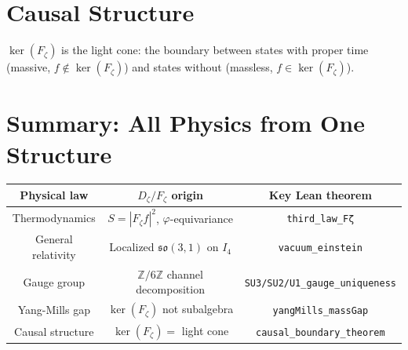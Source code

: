 \section{Causal Structure}
\label{sec:mat_causality}

\begin{theorem}
\label{thm:mat_causal_boundary}
\leanok
$\ker(F_\zeta)$ is the light cone: the boundary between states with proper time (massive, $f \notin \ker(F_\zeta)$) and states without (massless, $f \in \ker(F_\zeta)$).
\end{theorem}

\section{Summary: All Physics from One Structure}
\label{sec:mat_laws_summary}

\begin{center}
\begin{tabular}{|c|c|c|}
\hline
Physical law & $D_\zeta / F_\zeta$ origin & Key Lean theorem \\
\hline
Thermodynamics & $S = |F_\zeta f|^2$, $\varphi$-equivariance & \texttt{third\_law\_Fζ} \\
General relativity & Localized $\mathfrak{so}(3,1)$ on $I_4$ & \texttt{vacuum\_einstein} \\
Gauge group & $\mathbb{Z}/6\mathbb{Z}$ channel decomposition & \texttt{SU3/SU2/U1\_gauge\_uniqueness} \\
Yang-Mills gap & $\ker(F_\zeta)$ not subalgebra & \texttt{yangMills\_massGap} \\
Causal structure & $\ker(F_\zeta) =$ light cone & \texttt{causal\_boundary\_theorem} \\
\hline
\end{tabular}
\end{center}
